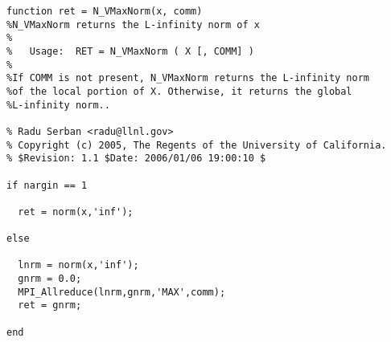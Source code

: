 \begin{lstlisting}[linerange={1-1,9-26}]
function ret = N_VMaxNorm(x, comm)
%N_VMaxNorm returns the L-infinity norm of x
%
%   Usage:  RET = N_VMaxNorm ( X [, COMM] )
%
%If COMM is not present, N_VMaxNorm returns the L-infinity norm 
%of the local portion of X. Otherwise, it returns the global
%L-infinity norm..

% Radu Serban <radu@llnl.gov>
% Copyright (c) 2005, The Regents of the University of California.
% $Revision: 1.1 $Date: 2006/01/06 19:00:10 $

if nargin == 1
  
  ret = norm(x,'inf');
  
else
  
  lnrm = norm(x,'inf');
  gnrm = 0.0;
  MPI_Allreduce(lnrm,gnrm,'MAX',comm);
  ret = gnrm;
  
end\end{lstlisting}

